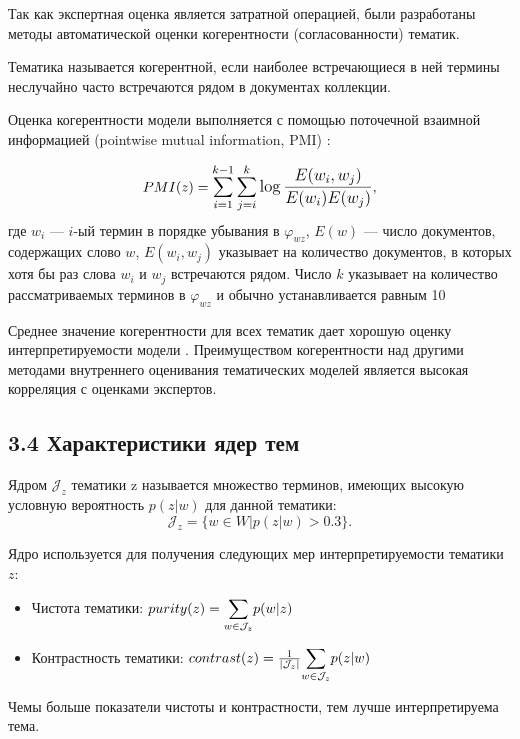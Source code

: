 \documentclass[a4paper]{report}
\begin{document}
	Так как экспертная оценка является затратной операцией, были разработаны методы автоматической оценки когерентности (согласованности) тематик.
	
	Тематика называется когерентной, если наиболее встречающиеся в ней термины неслучайно часто встречаются рядом в документах коллекции.
	
	Оценка когерентности модели выполняется с помощью поточечной взаимной информацией (pointwise mutual information, PMI) \cite{bib:Newman}:
	
	\begin{equation}
		PMI(z) = \mathlarger{
			\sum_{i=1}^{k-1} \sum_{j=i}^{k} \log 
			\dfrac
			{E(w_i,w_j)}
			{E(w_i)E(w_j)}
		},
	\label{eq:coherence}
	\end{equation}
	где $w_i$ --- $i$-ый термин в порядке убывания в $\varphi_{wz}$, $E(w)$ --- число документов, содержащих слово $w$, $E(w_i,w_j)$ указывает на количество документов, в которых хотя бы раз слова $w_i$ и $w_j$ встречаются рядом. Число $k$ указывает на количество рассматриваемых терминов в $\varphi_{wz}$ и обычно устанавливается равным 10 \cite{bib:Voron1}
	
	Среднее значение когерентности для всех тематик дает хорошую оценку интерпретируемости модели \cite{bib:Newman}. Преимуществом когерентности над другими методами внутреннего оценивания тематических моделей является высокая корреляция с оценками экспертов.
	
	
	\subsection{3.4 Характеристики ядер тем}
	
	
	Ядром $\mathcal{J}_z$ тематики z называется множество терминов, имеющих высокую условную вероятность $p(z|w)$ для данной тематики:
	$$ \mathcal{J}_z = \{ w \in W | p(z|w) > 0.3 \}. $$
	
	Ядро используется для получения следующих мер интерпретируемости тематики $z$:
	\begin{itemize}
	\item{Чистота тематики: $purity(z) = \mathlarger \sum_{w \in \mathcal{J}_z} p(w|z)$ }
	\item{Контрастность тематики: $ contrast (z) = \frac{1}{|\mathcal{J}_z|}
		\mathlarger \sum \limits_{w \in \mathcal{J}_z} p(z|w)
	$ }
	\end{itemize}
	
	Чемы больше показатели чистоты и контрастности, тем лучше интерпретируема тема.
	
\end{document}
